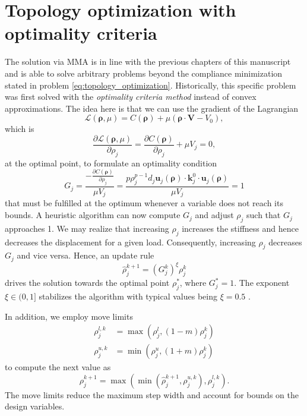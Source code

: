 \section{Topology optimization with optimality criteria}
The solution via MMA is in line with the previous chapters of this manuscript and is able to solve arbitrary problems beyond the compliance minimization stated in problem \eqref{eq:topology_optimization}. Historically, this specific problem was first solved with the \emph{optimality criteria method} instead of convex approximations. The idea here is that we can use the gradient of the Lagrangian
\begin{equation}
    \mathcal{L}(\pmb{\rho}, \mu) = C(\pmb{\rho}) + \mu \left( \pmb{\rho} \cdot \mathbf{V} - V_0 \right),
\end{equation}
which is
\begin{equation}
    \frac{\partial \mathcal{L} (\pmb{\rho}, \mu)}{\partial\rho_j} 
    = \frac{\partial C(\pmb{\rho})}{\partial \rho_j} + \mu V_j = 0,
\end{equation}
at the optimal point, to formulate an optimality condition
\begin{equation}
    G_j = \frac{-\frac{\partial C(\pmb{\rho})}{\partial \rho_j}}{\mu V_j} = \frac{p \rho_j^{p-1} d_j \mathbf{u}_j(\pmb{\rho})  \cdot \mathbf{k}^0_j \cdot \mathbf{u}_j(\pmb{\rho})}{\mu V_j} = 1
\end{equation}
that must be fulfilled at the optimum whenever a variable does not reach its bounds.
A heuristic algorithm can now compute $G_j$ and adjust $\rho_j$ such that $G_j$ approaches 1. We may realize that increasing $\rho_j$ increases the stiffness and hence decreases the displacement for a given load. Consequently, increasing $\rho_j$ decreases $G_j$ and vice versa. Hence, an update rule 
\begin{equation}
    \hat{\rho}_j^{k+1} = \left(G_j^k\right)^\xi \rho_j^k 
\end{equation}
drives the solution towards the optimal point $\rho_j^*$, where $G^*_j=1$. The exponent $\xi \in (0,1]$ stabilizes the algorithm with typical values being $\xi=0.5$ \cite{Harzheim2014}. 

In addition, we employ move limits 
\begin{align}
    \rho_j^{l,k} &= \max \left(\rho_j^l, (1-m)\rho_j^k \right) \\
    \rho_j^{u,k} &= \min \left(\rho_j^u, (1+m)\rho_j^k \right)
\end{align}
to compute the next value as 
\begin{equation}
    \rho_j^{k+1} = \max \left( \min \left(\hat{\rho}_j^{k+1}, \rho_j^{u,k} \right), \rho_j^{l,k} \right).
\end{equation}
The move limits reduce the maximum step width and account for bounds on the design variables. 

